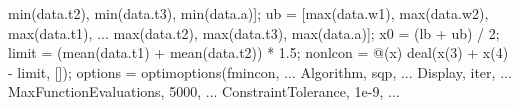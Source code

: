 \documentclass[
  letterpaper,
  DIV=11,
  numbers=noendperiod]{scrartcl}
\newenvironment{Shaded}{\begin{snugshade}}{\end{snugshade}}
\newcommand{\FloatTok}[1]{\textcolor[rgb]{0.68,0.00,0.00}{#1}}
\newcommand{\NormalTok}[1]{\textcolor[rgb]{0.00,0.23,0.31}{#1}}
\newcommand{\OperatorTok}[1]{\textcolor[rgb]{0.37,0.37,0.37}{#1}}
\newcommand{\SpecialStringTok}[1]{\textcolor[rgb]{0.13,0.47,0.30}{#1}}
\newcommand{\VariableTok}[1]{\textcolor[rgb]{0.07,0.07,0.07}{#1}}
\begin{document}
\begin{Shaded}
\begin{Highlighting}[]
      \VariableTok{min}\NormalTok{(}\VariableTok{data}\NormalTok{.}\VariableTok{t2}\NormalTok{)}\OperatorTok{,} \VariableTok{min}\NormalTok{(}\VariableTok{data}\NormalTok{.}\VariableTok{t3}\NormalTok{)}\OperatorTok{,} \VariableTok{min}\NormalTok{(}\VariableTok{data}\NormalTok{.}\VariableTok{a}\NormalTok{)]}\OperatorTok{;}
\VariableTok{ub} \OperatorTok{=}\NormalTok{ [}\VariableTok{max}\NormalTok{(}\VariableTok{data}\NormalTok{.}\VariableTok{w1}\NormalTok{)}\OperatorTok{,} \VariableTok{max}\NormalTok{(}\VariableTok{data}\NormalTok{.}\VariableTok{w2}\NormalTok{)}\OperatorTok{,} \VariableTok{max}\NormalTok{(}\VariableTok{data}\NormalTok{.}\VariableTok{t1}\NormalTok{)}\OperatorTok{,} \OperatorTok{...}
      \VariableTok{max}\NormalTok{(}\VariableTok{data}\NormalTok{.}\VariableTok{t2}\NormalTok{)}\OperatorTok{,} \VariableTok{max}\NormalTok{(}\VariableTok{data}\NormalTok{.}\VariableTok{t3}\NormalTok{)}\OperatorTok{,} \VariableTok{max}\NormalTok{(}\VariableTok{data}\NormalTok{.}\VariableTok{a}\NormalTok{)]}\OperatorTok{;}
\VariableTok{x0} \OperatorTok{=}\NormalTok{ (}\VariableTok{lb} \OperatorTok{+} \VariableTok{ub}\NormalTok{) }\OperatorTok{/} \FloatTok{2}\OperatorTok{;}
\VariableTok{limit} \OperatorTok{=}\NormalTok{ (}\VariableTok{mean}\NormalTok{(}\VariableTok{data}\NormalTok{.}\VariableTok{t1}\NormalTok{) }\OperatorTok{+} \VariableTok{mean}\NormalTok{(}\VariableTok{data}\NormalTok{.}\VariableTok{t2}\NormalTok{)) }\OperatorTok{*} \FloatTok{1.5}\OperatorTok{;}
\VariableTok{nonlcon} \OperatorTok{=} \OperatorTok{@}\NormalTok{(}\VariableTok{x}\NormalTok{) }\VariableTok{deal}\NormalTok{(}\VariableTok{x}\NormalTok{(}\FloatTok{3}\NormalTok{) }\OperatorTok{+} \VariableTok{x}\NormalTok{(}\FloatTok{4}\NormalTok{) }\OperatorTok{{-}} \VariableTok{limit}\OperatorTok{,}\NormalTok{ [])}\OperatorTok{;} 
\VariableTok{options} \OperatorTok{=} \VariableTok{optimoptions}\NormalTok{(}\SpecialStringTok{\textquotesingle{}fmincon\textquotesingle{}}\OperatorTok{,} \OperatorTok{...}
    \SpecialStringTok{\textquotesingle{}Algorithm\textquotesingle{}}\OperatorTok{,} \SpecialStringTok{\textquotesingle{}sqp\textquotesingle{}}\OperatorTok{,} \OperatorTok{...}
    \SpecialStringTok{\textquotesingle{}Display\textquotesingle{}}\OperatorTok{,} \SpecialStringTok{\textquotesingle{}iter\textquotesingle{}}\OperatorTok{,} \OperatorTok{...}
    \SpecialStringTok{\textquotesingle{}MaxFunctionEvaluations\textquotesingle{}}\OperatorTok{,} \FloatTok{5000}\OperatorTok{,} \OperatorTok{...}
    \SpecialStringTok{\textquotesingle{}ConstraintTolerance\textquotesingle{}}\OperatorTok{,} \FloatTok{1e{-}9}\OperatorTok{,} \OperatorTok{...}

\end{Highlighting}
\end{Shaded}
\end{document}
